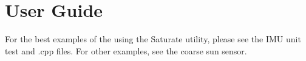 \section{User Guide}
For the best examples of the using the Saturate utility, please see the IMU unit test and .cpp files. For other examples, see the  coarse sun sensor.